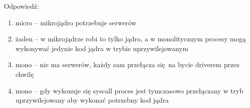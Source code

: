 Odpowiedź:
\begin{enumerate}
    \item micro -- mikrojądro potrzebuje serwerów
    \item żaden -- w mikrojądrze robi to tylko jądro, a w monolitycznym procesy mogą wykonywać jedynie kod jądra w trybie uprzywilejowanym
    \item mono -- nie ma serwerów, każdy sam przełącza się na bycie driverem przez chwilę
    \item mono -- gdy wykonuje się syscall proces jest tymczasowo przełączany w tryb uprzywilejowany aby wykonać potrzebny kod jądra
\end{enumerate}